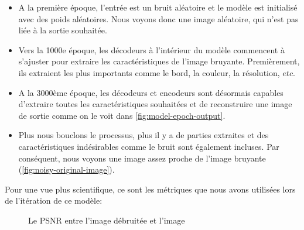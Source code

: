 \documentclass[
  11pt,
  dvipsnames]{article}
\providecommand{\tightlist}{%
  \setlength{\itemsep}{0pt}\setlength{\parskip}{0pt}}
\begin{document}
\begin{itemize}
\tightlist
\item
  A la première époque, l'entrée est un bruit aléatoire et le modèle est initialisé avec des poids aléatoires. Nous voyons donc une image aléatoire, qui n'est pas liée à la sortie souhaitée.
\item
  Vers la 1000e époque, les décodeurs à l'intérieur du modèle commencent à s'ajuster pour extraire les caractéristiques de l'image bruyante. Premièrement, ils extraient les plus importants comme le bord, la couleur, la résolution, \(etc.\)
\item
  A la 3000ème époque, les décodeurs et encodeurs sont désormais capables d'extraire toutes les caractéristiques souhaitées et de reconstruire une image de sortie comme on le voit dans \ref{fig:model-epoch-output}.
\item
  Plus nous bouclons le processus, plus il y a de parties extraites et des caractéristiques indésirables comme le bruit sont également incluses. Par conséquent, nous voyons une image assez proche de l'image bruyante (\ref{fig:noisy-original-image}).
\end{itemize}

Pour une vue plus scientifique, ce sont les métriques que nous avons utilisées lors de l'itération de ce modèle:

\begin{figure}

{\centering {}

}

\caption{Le PSNR entre l'image débruitée et l'image}\label{fig:model-psnr}
\end{figure}
\end{document}
